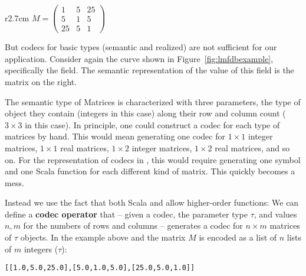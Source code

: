 \begin{wrapfigure}r{2.7cm}\vspace*{-2em}
$M = \left(
    \begin{array}{ccc}
      1 & 5 & 25 \\
      5 & 1 & 5 \\
      25 & 5 & 1 \end{array} 
  \right)$\vspace*{-1em}
\end{wrapfigure}
But codecs for basic types (semantic and realized) are not sufficient for our application.
Consider again the  curve shown in Figure~\ref{fig:lmfdbexample}, specifically the  field. 
The semantic representation of the value of this field is the matrix on the right.

The semantic type of Matrices is characterized with three parameters, the type of object they contain (integers in this case) along their row and column count ($3 \times 3$ in this case). 
In principle, one could construct a codec for each type of matrices by hand. 
This would mean generating one codec for $1 \times 1$ integer matrices, $1 \times 1$ real matrices, $1 \times 2$ integer matrices, $1 \times 2$ real matrices, and so on. 
For the representation of codecs in \mmt, this would require generating one symbol and one Scala function for each different kind of matrix. 
This quickly becomes a mess.

Instead we use the fact that both Scala and \ommt allow higher-order functions: 
We can define a \textbf{codec operator} that -- given a codec, the parameter type $\tau$, and values $n, m$ for the numbers of rows and columns -- generates a codec for $n\times m$ matrices of $\tau$ objects. 
In the example above and the matrix $M$ is encoded as a list of $n$ lists of $m$ integers ($\tau$):
\begin{lstlisting}[]
[[1.0,5.0,25.0],[5.0,1.0,5.0],[25.0,5.0,1.0]]
\end{lstlisting}

